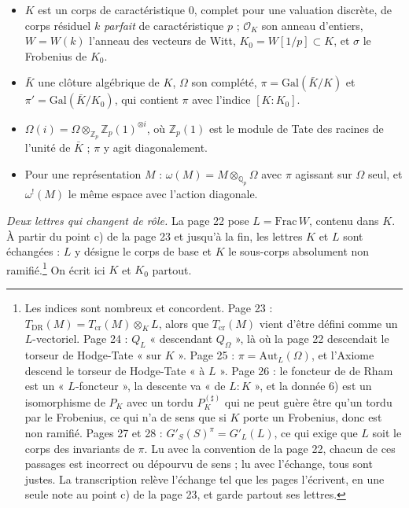 \documentclass[11pt,a4paper]{article}
\begin{document}
\begin{itemize}
  \item $K$ est un corps de caractéristique $0$, complet pour une valuation
  discrète, de corps résiduel $k$ \emph{parfait} de caractéristique $p$ ;
  $\mathcal{O}_K$ son anneau d'entiers, $W = W(k)$ l'anneau des vecteurs de
  Witt, $K_0 = W[1/p] \subset K$, et $\sigma$ le Frobenius de $K_0$.
  \item $\bar{K}$ une clôture algébrique de $K$, $\Omega$ son complété,
  $\pi = \mathrm{Gal}(\bar{K}/K)$ et $\pi' = \mathrm{Gal}(\bar{K}/K_0)$, qui
  contient $\pi$ avec l'indice $[K : K_0]$.
  \item $\Omega(i) = \Omega \otimes_{\mathbb{Z}_p} \mathbb{Z}_p(1)^{\otimes i}$,
  où $\mathbb{Z}_p(1)$ est le module de Tate des racines de l'unité de
  $\bar{K}$ ; $\pi$ y agit diagonalement.
  \item Pour une représentation $M$ : $\omega(M) = M \otimes_{\mathbb{Q}_p}
  \Omega$ avec $\pi$ agissant sur $\Omega$ seul, et $\omega^{!}(M)$ le même
  espace avec l'action diagonale.
\end{itemize}

\emph{Deux lettres qui changent de rôle.} La page 22 pose
$L = \mathrm{Frac}\, W$, contenu dans $K$. À partir du point c) de la page 23
et jusqu'à la fin, les lettres $K$ et $L$ sont échangées : $L$ y désigne le
corps de base et $K$ le sous-corps absolument non ramifié.\footnote{Les
indices sont nombreux et concordent. Page 23 :
$T_{\mathrm{DR}}(M) = T_{\mathrm{cr}}(M) \otimes_K L$, alors que
$T_{\mathrm{cr}}(M)$ vient d'être défini comme un $L$-vectoriel. Page 24 :
$Q_L$ « descendant $Q_{\Omega}$ », là où la page 22 descendait le torseur de
Hodge-Tate « sur $K$ ». Page 25 : $\pi = \mathrm{Aut}_L(\Omega)$, et l'Axiome descend le
torseur de Hodge-Tate « à $L$ ».
Page 26 : le foncteur de de Rham est un « $L$-foncteur », la descente va « de
$L : K$ », et la donnée 6) est un isomorphisme de $P_K$ avec un tordu
$P_K^{(\sharp)}$ qui ne peut guère être qu'un tordu par le Frobenius, ce qui
n'a de sens que si $K$ porte un Frobenius, donc est non ramifié. Pages 27 et 28 : $G'_S(S)^{\pi} = G'_L(L)$, ce qui exige que $L$ soit
le corps des invariants de $\pi$. Lu avec la convention de la page 22, chacun
de ces passages est incorrect ou dépourvu de sens ; lu avec l'échange, tous
sont justes. La
transcription relève l'échange tel que les pages l'écrivent, en une seule note
au point c) de la page 23, et garde partout ses lettres.} On écrit ici $K$ et $K_0$ partout.

\end{document}
